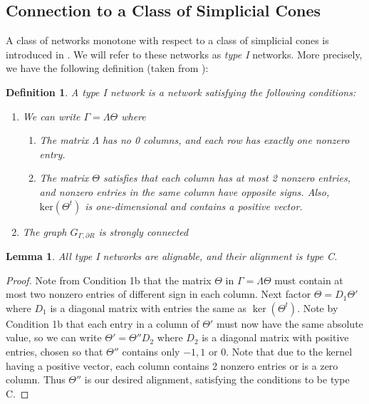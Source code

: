 \documentclass{article}
\newtheorem{lem}{Lemma}
\newtheorem{define}{Definition}
\begin{document}
\subsection{Connection to a Class of Simplicial Cones}
\label{sec:type_I_networks}

A class of networks monotone with respect to a class of simplicial cones is introduced in \cite{doi:10.1137/120898486}. We will refer to these networks as \textit{type I} networks. More precisely, we have the following definition (taken from \cite{doi:10.1137/120898486}):

\begin{define}
\label{def:type I networks}
    A \textit{type I} network is a network satisfying the following conditions:

    \begin{enumerate}
        \item We can write $\Gamma = \Lambda \Theta$ where
        \begin{enumerate}
            \item The matrix $\Lambda$ has no 0 columns, and each row has exactly one nonzero entry.
            \item The matrix $\Theta$ satisfies that each column has at most 2 nonzero entries, and nonzero entries in the same column have opposite signs. Also, $\mbox{ker} (\Theta^t)$ is one-dimensional and contains a positive vector.
        \end{enumerate}
        \item The graph $G_{\Gamma, \partial R}$ is strongly connected
    \end{enumerate}
\end{define}

\begin{lem}
    All type I networks are alignable, and their alignment is type C.
\end{lem}

\begin{proof}
    Note from Condition 1b that the matrix $\Theta$ in $\Gamma = \Lambda \Theta$ must contain at most two nonzero entries of different sign in each column. Next factor $\Theta = D_1 \Theta'$ where $D_1$ is a diagonal matrix with entries the same as $\ker(\Theta^t)$. Note by Condition 1b that each entry in a column of $\Theta'$ must now have the same absolute value, so we can write $\Theta' = \Theta'' D_2$ where $D_2$ is a diagonal matrix with positive entries, chosen so that $\Theta''$ contains only $-1,1$ or $0$. Note that due to the kernel having a positive vector, each column contains 2 nonzero entries or is a zero column. Thus $\Theta''$ is our desired alignment, satisfying the conditions to be type C.
\end{proof}
\end{document}
